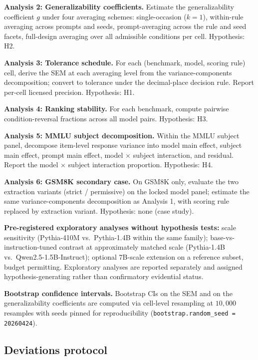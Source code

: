 \documentclass[11pt]{article}
\begin{document}
\textbf{Analysis 2: Generalizability coefficients.} Estimate the generalizability coefficient $g$ under four averaging schemes: single-occasion ($k = 1$), within-rule averaging across prompts and seeds, prompt-averaging across the rule and seed facets, full-design averaging over all admissible conditions per cell. Hypothesis: H2.

\textbf{Analysis 3: Tolerance schedule.} For each (benchmark, model, scoring rule) cell, derive the SEM at each averaging level from the variance-components decomposition; convert to tolerance under the decimal-place decision rule. Report per-cell licensed precision. Hypothesis: H1.

\textbf{Analysis 4: Ranking stability.} For each benchmark, compute pairwise condition-reversal fractions across all model pairs. Hypothesis: H3.

\textbf{Analysis 5: MMLU subject decomposition.} Within the MMLU subject panel, decompose item-level response variance into model main effect, subject main effect, prompt main effect, model $\times$ subject interaction, and residual. Report the model $\times$ subject interaction proportion. Hypothesis: H4.

\textbf{Analysis 6: GSM8K secondary case.} On GSM8K only, evaluate the two extraction variants (strict / permissive) on the locked model panel; estimate the same variance-components decomposition as Analysis 1, with scoring rule replaced by extraction variant. Hypothesis: none (case study).

\textbf{Pre-registered exploratory analyses without hypothesis tests:} scale sensitivity (Pythia-410M vs.\ Pythia-1.4B within the same family); base-vs-instruction-tuned contrast at approximately matched scale (Pythia-1.4B vs.\ Qwen2.5-1.5B-Instruct); optional 7B-scale extension on a reference subset, budget permitting. Exploratory analyses are reported separately and assigned hypothesis-generating rather than confirmatory evidential status.

\textbf{Bootstrap confidence intervals.} Bootstrap CIs on the SEM and on the generalizability coefficients are computed via cell-level resampling at $10{,}000$ resamples with seeds pinned for reproducibility (\texttt{bootstrap.random\_seed = 20260424}).

\subsection{Deviations protocol}
\label{app:prereg-deviations}
\end{document}
